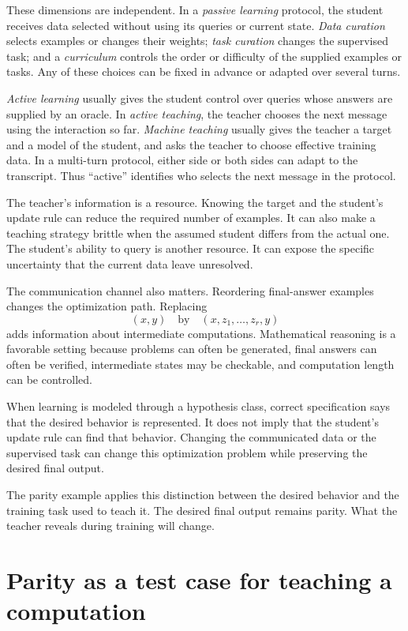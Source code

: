 \documentclass[11pt,twoside]{article}
\theoremstyle{definition}
\theoremstyle{remark}
\begin{document}
These dimensions are independent. In a \emph{passive learning} protocol, the
student receives data selected without using its queries or current state.
\emph{Data curation} selects examples or changes their weights;
\emph{task curation} changes the supervised task; and a \emph{curriculum}
controls the order or difficulty of the supplied examples or tasks. Any of
these choices can be fixed in advance or adapted over several turns.

\emph{Active learning} usually gives the student control over queries whose
answers are supplied by an oracle. In \emph{active teaching}, the teacher
chooses the next message using the interaction so far. \emph{Machine teaching}
usually gives the teacher a target and a model of the student, and asks the
teacher to choose effective training data. In a multi-turn protocol, either
side or both sides can adapt to the transcript. Thus ``active'' identifies who
selects the next message in the protocol.

The teacher's information is a resource. Knowing the target and the student's
update rule can reduce the required number of examples. It can also make a
teaching strategy brittle when the assumed student differs from the actual
one. The student's ability to query is another resource. It can expose the
specific uncertainty that the current data leave unresolved.

The communication channel also matters. Reordering final-answer examples
changes the optimization path. Replacing
\[
(x,y)
\quad\text{by}\quad
(x,z_1,\ldots,z_r,y)
\]
adds information about intermediate computations. Mathematical reasoning is
a favorable setting because problems can often be generated, final answers
can often be verified, intermediate states may be checkable, and computation
length can be controlled.

When learning is modeled through a hypothesis class, correct specification
says that the desired behavior is represented. It does not imply that the
student's update rule can find that behavior. Changing the communicated data
or the supervised task can change this optimization problem while preserving
the desired final output.

The parity example applies this distinction between the desired behavior and
the training task used to teach it. The desired final output remains parity.
What the teacher reveals during training will change.

\clearpage
\section{Parity as a test case for teaching a computation}
\label{sec:parity-setup}
\end{document}
